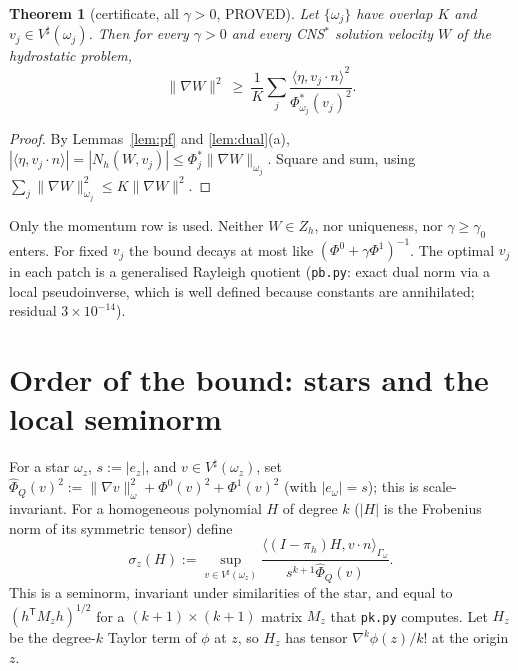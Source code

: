 \documentclass[11pt]{article}
\newtheorem{theorem}{Theorem}[section]
\theoremstyle{remark}
\newcommand{\ip}[2]{\langle #1,#2\rangle}
\begin{document}
\begin{theorem}[certificate, all $\gamma>0$, PROVED]\label{thm:cert}
Let $\{\omega_j\}$ have overlap $K$ and $v_j\in V^\sharp(\omega_j)$. Then for every $\gamma>0$ and every CNS$^\ast$ solution velocity $W$ of the
hydrostatic problem,
\[
\|\nabla W\|^2\ \ge\ \frac1K\sum_j\frac{\ip{\eta}{v_j\cdot n}^2}{\Phi^\ast_{\omega_j}(v_j)^2}.
\]
\end{theorem}
\begin{proof}
By Lemmas~\ref{lem:pf} and \ref{lem:dual}(a), $|\ip{\eta}{v_j\cdot n}|=|N_h(W,v_j)|\le\Phi^\ast_j\|\nabla W\|_{\omega_j}$. Square and
sum, using $\sum_j\|\nabla W\|^2_{\omega_j}\le K\|\nabla W\|^2$.
\end{proof}
Only the momentum row is used. Neither $W\in Z_h$, nor uniqueness, nor $\gamma\ge\gamma_0$ enters. For fixed $v_j$ the bound
decays at most like $(\Phi^0+\gamma\Phi^1)^{-1}$. The optimal $v_j$ in each patch is a generalised Rayleigh quotient
(\texttt{pb.py}: exact dual norm via a local pseudoinverse, which is well defined because constants are annihilated;
residual $3\times10^{-14}$).

\section{Order of the bound: stars and the local seminorm}
For a star $\omega_z$, $s:=|e_z|$, and $v\in V^\sharp(\omega_z)$, set
$\hat\Phi_Q(v)^2:=\|\nabla v\|^2_{\omega}+\Phi^0(v)^2+\Phi^1(v)^2$ (with $|e_\omega|=s$); this is scale-invariant. For a
homogeneous polynomial $H$ of degree $k$ ($|H|$ is the Frobenius norm of its symmetric tensor) define
\[
\sigma_z(H):=\sup_{v\in V^\sharp(\omega_z)}\frac{\ip{(I-\pi_h)H}{v\cdot n}_{\Gamma_\omega}}{s^{k+1}\hat\Phi_Q(v)} .
\]
This is a seminorm, invariant under similarities of the star, and equal to $(h^{\mathsf T}M_zh)^{1/2}$ for a $(k+1)\times(k+1)$ matrix
$M_z$ that \texttt{pk.py} computes. Let $H_z$ be the degree-$k$ Taylor term of $\phi$ at $z$, so $H_z$ has tensor
$\nabla^k\phi(z)/k!$ at the origin $z$.
\end{document}
